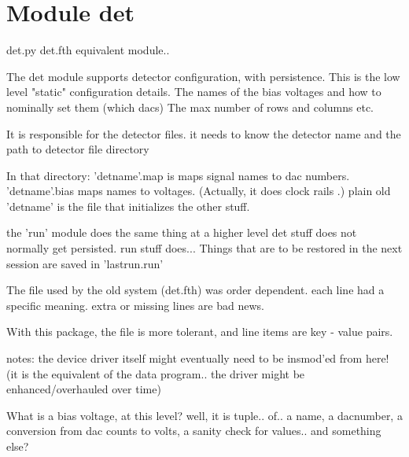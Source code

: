 %
%
%


\section{Module det}

    \label{det}
det.py det.fth equivalent module..

The det module supports detector configuration, with persistence. This is 
the low level "static" configuration details. The names of the bias 
voltages and how to nominally set them (which dacs) The max number of rows 
and columns etc.

It is responsible for the detector files. it needs to know the detector 
name and the path to detector file directory

In that directory: 'detname'.map is maps signal names to dac numbers. 
'detname'.bias maps names to voltages. (Actually, it does clock rails .) 
plain old 'detname' is the file that initializes the other stuff.

the 'run' module does the same thing at a higher level det stuff does not 
normally get persisted. run stuff does... Things that are to be restored in
the next session are saved in 'lastrun.run'

The file used by the old system (det.fth) was order dependent. each line 
had a specific meaning. extra or missing lines are bad news.

With this package, the file is more tolerant, and line items are key - 
value pairs.

notes: the device driver itself might eventually need to be insmod'ed from 
here! (it is the equivalent of the data program.. the driver might be 
enhanced/overhauled over time)

What is a bias voltage, at this level? well, it is tuple.. of.. a name, a 
dacnumber, a conversion from dac counts to volts, a sanity check for 
values.. and something else?



